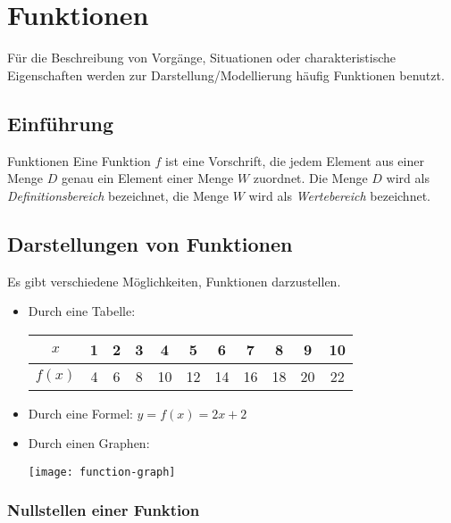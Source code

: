 \section{Funktionen}\label{sec:funktionen}
\setcounter{page}{1}

Für die Beschreibung von Vorgänge, Situationen oder charakteristische Eigenschaften werden zur Darstellung/Modellierung häufig Funktionen benutzt.

\subsection{Einführung}\label{subsec:einfuhrung-funktionen}

\begin{definition}{Funktionen}
    Eine Funktion $f$ ist eine Vorschrift, die jedem Element aus einer Menge $D$ genau ein Element einer Menge $W$ zuordnet.
    Die Menge $D$ wird als \emph{Definitionsbereich} bezeichnet, die Menge $W$ wird als \emph{Wertebereich} bezeichnet.
\end{definition}

\subsection{Darstellungen von Funktionen}\label{subsec:darstellungen-von-funktionen}

Es gibt verschiedene Möglichkeiten, Funktionen darzustellen.
\begin{itemize}
    \item Durch eine Tabelle: $\quad$
    \begin{tabular}{|c|c|c|c|c|c|c|c|c|c|c|}
        \hline
        $x$    & 1 & 2 & 3 & 4  & 5  & 6  & 7  & 8  & 9  & 10 \\
        \hline
        $f(x)$ & 4 & 6 & 8 & 10 & 12 & 14 & 16 & 18 & 20 & 22 \\
        \hline
    \end{tabular}
    \item Durch eine Formel: $y = f(x) = 2x + 2$
    \item Durch einen Graphen:
    \begin{center}
        \texttt{[image: function-graph]}
    \end{center}
\end{itemize}

\subsubsection{Nullstellen einer Funktion}

